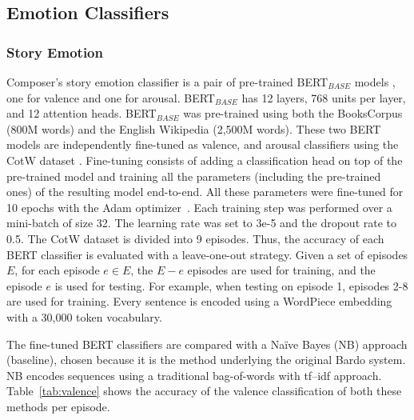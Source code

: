 \subsection{Emotion Classifiers}

\subsubsection{Story Emotion}

Composer's story emotion classifier is a pair of pre-trained BERT$_{BASE}$ models \cite{devlin2018bert}, one for valence and one for arousal. BERT$_{BASE}$ has 12 layers, 768 units per layer, and 12 attention heads. BERT$_{BASE}$ was pre-trained using both the BooksCorpus (800M words) \cite{zhu2015aligning} and the English Wikipedia (2,500M words). These two BERT models are independently fine-tuned as valence, and arousal classifiers using the CotW dataset \cite{padovani2017}. Fine-tuning consists of adding a classification head on top of the pre-trained model and training all the parameters (including the pre-trained ones) of the resulting model end-to-end. All these parameters were fine-tuned for 10 epochs with the Adam optimizer~\cite{adam14}. Each training step was performed over a mini-batch of size 32. The learning rate was set to 3e-5 and the dropout rate to 0.5. The CotW dataset is divided into 9 episodes. Thus, the accuracy of each BERT classifier is evaluated with a leave-one-out strategy. Given a set of episodes $E$, for each episode $e \in E$, the $E - e$ episodes are used for training, and the episode $e$ is used for testing. For example, when testing on episode 1, episodes 2-8 are used for training. Every sentence is encoded using a WordPiece embedding \cite{wu2016google} with a 30,000 token vocabulary.

The fine-tuned BERT classifiers are compared with a Na\"ive Bayes (NB) approach (baseline), chosen because it is the method underlying the original Bardo system. NB encodes sequences using a traditional bag-of-words with tf–idf approach. Table~\ref{tab:valence} shows the accuracy of the valence classification of both these methods per episode.

